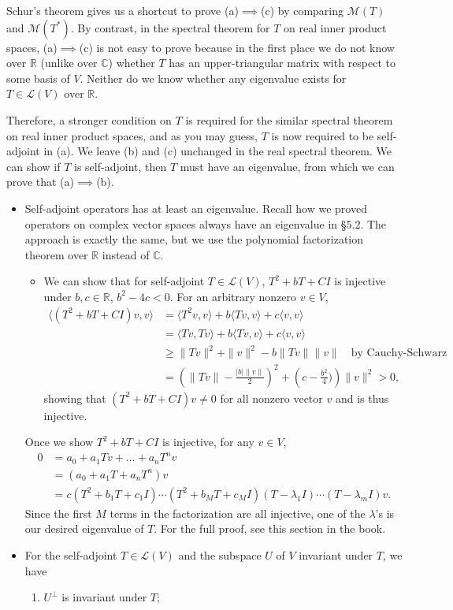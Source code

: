 \documentclass{article}
\newcommand{\R}{\mathbb{R}}
\newcommand{\C}{\mathbb{C}}
\newcommand{\inp}[2]{\langle #1, #2 \rangle}
\newcommand{\nm}[1]{\| #1 \|}
\newcommand{\LV}{\mathcal{L}(V)}
\newcommand{\M}{\mathcal{M}}
\begin{document}
Schur's theorem gives us a shortcut to prove (a)$\implies$(c) by comparing $\M(T)$ and $\M(T^*)$. By contrast, in the spectral theorem for $T$ on real inner product spaces, (a)$\implies$(c) is not easy to prove because in the first place we do not know over $\R$ (unlike over $\C$) whether $T$ has an upper-triangular matrix with respect to some basis of $V$. Neither do we know whether any eigenvalue exists for $T \in \LV$ over $\R$.

Therefore, a stronger condition on $T$ is required for the similar spectral theorem on real inner product spaces, and as you may guess, $T$ is now required to be self-adjoint in (a). We leave (b) and (c) unchanged in the real spectral theorem. We can show if $T$ is self-adjoint, then $T$ must have an eigenvalue, from which we can prove that (a)$\implies$(b).
    \begin{itemize}
    \item Self-adjoint operators has at least an eigenvalue. Recall how we proved operators on complex vector spaces always have an eigenvalue in \S 5.2. The approach is exactly the same, but we use the polynomial factorization theorem over $\R$ instead of $\C$.
    \begin{itemize}
        \item We can show that for self-adjoint $T \in \LV$, $T^2+bT+CI$ is injective under $b,c\in\R$, $b^2-4c<0$. For an arbitrary nonzero $v \in V$,
        \begin{align*}
            \inp{(T^2+bT+CI)v}{v} & = \inp{T^2v}{v}+b\inp{Tv}{v}+c\inp{v}{v} \\
            & = \inp{Tv}{Tv}+b\inp{Tv}{v}+c\inp{v}{v} \\
            & \geq \nm{Tv}^2+\nm{v}^2 -b\nm{Tv}\nm{v} \quad \text{by Cauchy-Schwarz}\\
            & = \left(\nm{Tv}-\frac{|b|\nm{v}}{2}\right)^2 + \left(c - \frac{b^2}{4})\right)\nm{v}^2 > 0,
        \end{align*}
        showing that $(T^2+bT+CI)v \not= 0$ for all nonzero vector $v$ and is thus injective.
    \end{itemize}
    Once we show $T^2+bT+CI$ is injective, for any $v \in V$,
    \begin{align*}
        0 & = a_0+a_1Tv+\dots+a_nT^nv \\
        & = (a_0+a_1T+a_nT^n) v \\
        & = c(T^2+b_1T+c_1I)\cdots(T^2+b_MT+c_MI)(T-\lambda_1I)\cdots(T-\lambda_mI)v.
    \end{align*}
    Since the first $M$ terms in the factorization are all injective, one of the $\lambda$'s is our desired eigenvalue of $T$. For the full proof, see this section in the book.
    \item For the self-adjoint $T \in \LV$ and the subspace $U$ of $V$ invariant under $T$, we have
    \begin{enumerate}[label=(\alph*)]
        \item $U^\perp$ is invariant under $T$;
        

\end{enumerate}
\end{itemize}
\end{document}
